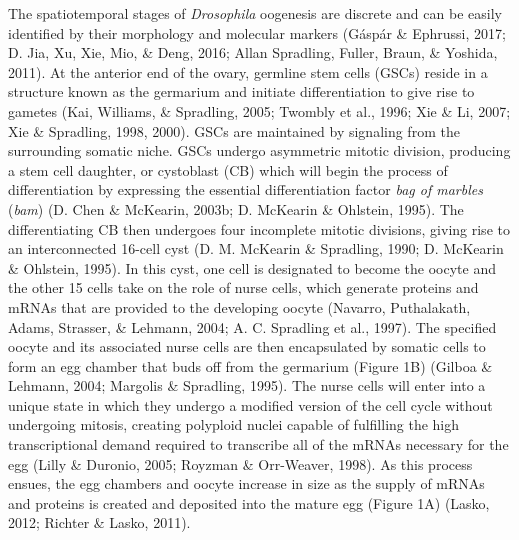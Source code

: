 \documentclass[12pt,oneside]{reedthesis}
\begin{document}
The spatiotemporal stages of \emph{Drosophila} oogenesis are discrete and can
be easily identified by their morphology and molecular markers
(Gáspár \& Ephrussi, 2017; D. Jia, Xu, Xie, Mio, \& Deng, 2016; Allan Spradling, Fuller, Braun, \& Yoshida, 2011). At the anterior end of
the ovary, germline stem cells (GSCs) reside in a structure known as the
germarium and initiate differentiation to give rise to gametes
(Kai, Williams, \& Spradling, 2005; Twombly et al., 1996; Xie \& Li, 2007; Xie \& Spradling, 1998, 2000). GSCs
are maintained by signaling from the surrounding somatic niche. GSCs
undergo asymmetric mitotic division, producing a stem cell daughter, or
cystoblast (CB) which will begin the process of differentiation by
expressing the essential differentiation factor \emph{bag of marbles} (\emph{bam})
(D. Chen \& McKearin, 2003b; D. McKearin \& Ohlstein, 1995). The differentiating CB then undergoes
four incomplete mitotic divisions, giving rise to an interconnected
16-cell cyst (D. M. McKearin \& Spradling, 1990; D. McKearin \& Ohlstein, 1995). In this cyst, one
cell is designated to become the oocyte and the other 15 cells take on
the role of nurse cells, which generate proteins and mRNAs that are
provided to the developing oocyte (Navarro, Puthalakath, Adams, Strasser, \& Lehmann, 2004; A. C. Spradling et al., 1997).
The specified oocyte and its associated nurse cells are then
encapsulated by somatic cells to form an egg chamber that buds off from
the germarium (Figure 1B) (Gilboa \& Lehmann, 2004; Margolis \& Spradling, 1995). The nurse
cells will enter into a unique state in which they undergo a modified
version of the cell cycle without undergoing mitosis, creating polyploid
nuclei capable of fulfilling the high transcriptional demand required to
transcribe all of the mRNAs necessary for the egg (Lilly \& Duronio, 2005; Royzman \& Orr-Weaver, 1998). As this process ensues, the egg chambers and oocyte
increase in size as the supply of mRNAs and proteins is created and
deposited into the mature egg (Figure 1A) (Lasko, 2012; Richter \& Lasko, 2011).
\end{document}
